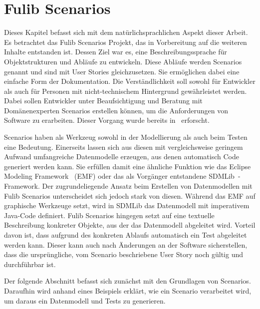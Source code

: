 \chapter{Fulib Scenarios}\label{ch:fulib-scenarios}

Dieses Kapitel befasst sich mit dem natürlichsprachlichen Aspekt dieser Arbeit.
Es betrachtet das Fulib Scenarios Projekt, das in Vorbereitung auf die weiteren Inhalte entstanden ist.
Dessen Ziel war es, eine Beschreibungssprache für Objektstrukturen und Abläufe zu entwickeln.
Diese Abläufe werden Scenarios genannt und sind mit User Stories gleichzusetzen.
Sie ermöglichen dabei eine einfache Form der Dokumentation.
Die Verständlichkeit soll sowohl für Entwickler als auch für Personen mit nicht-technischem Hintergrund gewährleistet werden.
Dabei sollen Entwickler unter Beaufsichtigung und Beratung mit Domänenexperten Scenarios erstellen können, um die Anforderungen von Software zu erarbeiten.
Dieser Vorgang wurde bereits in~\cite{explain} erforscht.

Scenarios haben als Werkzeug sowohl in der Modellierung als auch beim Testen eine Bedeutung.
Einerseits lassen sich aus diesen mit vergleichsweise geringem Aufwand umfangreiche Datenmodelle erzeugen, aus denen automatisch Code generiert werden kann.
Sie erfüllen damit eine ähnliche Funktion wie das Eclipse Modeling Framework~\cite{emf} (EMF) oder das als Vorgänger entstandene SDMLib~\cite{networkparser}-Framework.
Der zugrundeliegende Ansatz beim Erstellen von Datenmodellen mit Fulib Scenarios unterscheidet sich jedoch stark von diesen.
Während das EMF auf graphische Werkzeuge setzt, wird in SDMLib das Datenmodell mit imperativem Java-Code definiert.
Fulib Scenarios hingegen setzt auf eine textuelle Beschreibung konkreter Objekte, aus der das Datenmodell abgeleitet wird.
Vorteil davon ist, dass aufgrund des konkreten Ablaufs automatisch ein Test abgeleitet werden kann.
Dieser kann auch nach Änderungen an der Software sicherstellen, dass die ursprüngliche, vom Scenario beschriebene User Story noch gültig und durchführbar ist.

Der folgende Abschnitt befasst sich zunächst mit den Grundlagen von Scenarios.
Daraufhin wird anhand eines Beispiels erklärt, wie ein Scenario verarbeitet wird, um daraus ein Datenmodell und Tests zu generieren.



